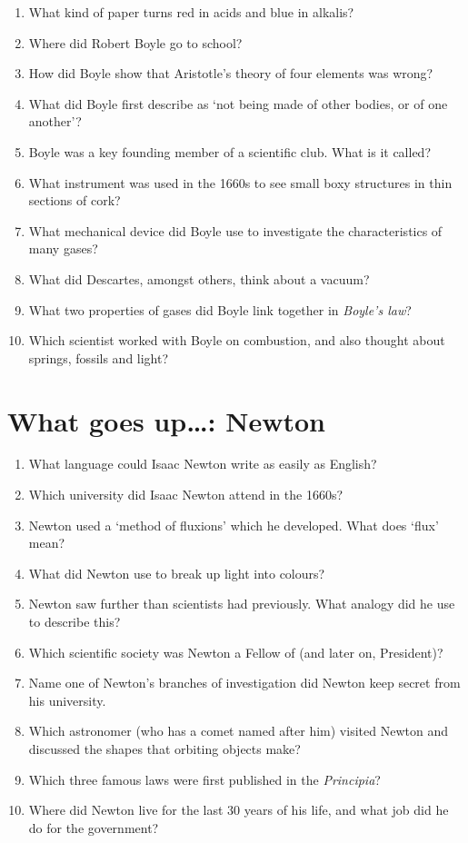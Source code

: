 \documentclass[a4paper,12pt]{article}
\begin{document}
\begin{enumerate}
\item What kind of paper turns red in acids and blue in alkalis?
\item Where did Robert Boyle go to school?
\item How did Boyle show that Aristotle's theory of four elements was wrong?
\item What did Boyle first describe as `not being made of other bodies, or of one another'?
\item Boyle was a key founding member of a scientific club.  What is it called?
\item What instrument was used in the 1660s to see small boxy structures in thin sections of cork?
\item What mechanical device did Boyle use to investigate the characteristics of many gases?
\item What did Descartes, amongst others, think about a vacuum?
\item What two properties of gases did Boyle link together in \emph{Boyle's law}?
\item Which scientist worked with Boyle on combustion, and also thought about springs, fossils and light?
\end{enumerate}

\section{What goes up\ldots: Newton} %

\begin{enumerate}
\item What language could Isaac Newton write as easily as English?
\item Which university did Isaac Newton attend in the 1660s?
\item Newton used a `method of fluxions' which he developed.  What does `flux' mean?
\item What did Newton use to break up light into colours?
\item Newton saw further than scientists had previously.  What analogy did he use to describe this?
\item Which scientific society was Newton a Fellow of (and later on, President)?
\item Name one of Newton's branches of investigation did Newton keep secret from his university.
\item Which astronomer (who has a comet named after him) visited Newton and discussed the shapes that orbiting objects make?
\item Which three famous laws were first published in the \emph{Principia}?
\item Where did Newton live for the last 30 years of his life, and what job did he do for the government?
\end{enumerate}
\end{document}
